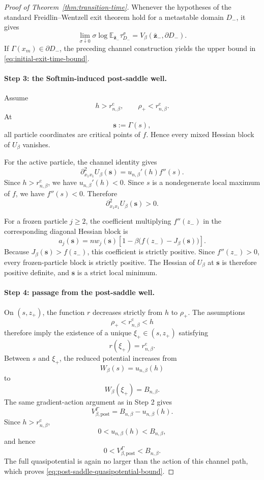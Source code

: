 \documentclass{article}
\theoremstyle{plain}
\theoremstyle{definition}
\theoremstyle{remark}
\begin{document}
\begin{proof}[Proof of Theorem~\ref{thm:transition-time}]
Whenever the hypotheses of the standard Freidlin--Wentzell exit theorem hold for a metastable domain \(D_-\), it gives
\[
    \lim_{\sigma\downarrow0}
    \sigma\log
    \mathbb E_{\bar{\mathbf z}_-}\tau_{D_-}^\sigma
    =
    V_\beta(\bar{\mathbf z}_-,\partial D_-).
\]
If \(\Gamma(x_m)\in\partial D_-\), the preceding channel construction yields the upper bound in \eqref{eq:initial-exit-time-bound}.

\paragraph{Step 3: the Softmin-induced post-saddle well.}
Assume
\[
    h>r_{n,\beta}^{\mathrm c},
    \qquad
    \rho_+<r_{n,\beta}^{\mathrm c}.
\]
At
\[
    \mathbf s:=\Gamma(s),
\]
all particle coordinates are critical points of \(f\). Hence every mixed Hessian block of \(U_\beta\) vanishes.

For the active particle, the channel identity gives
\[
    \partial_{x_1x_1}^2U_\beta(\mathbf s)
    =
    u_{n,\beta}'(h)f''(s).
\]
Since \(h>r_{n,\beta}^{\mathrm c}\), we have
\(u_{n,\beta}'(h)<0\). Since \(s\) is a nondegenerate local maximum of \(f\), we have \(f''(s)<0\). Therefore
\[
    \partial_{x_1x_1}^2U_\beta(\mathbf s)>0.
\]

For a frozen particle \(j\ge2\), the coefficient multiplying
\(f''(z_-)\) in the corresponding diagonal Hessian block is
\[
    a_j(\mathbf s)
    =
    n w_j(\mathbf s)
    \left[
        1-
        \beta\bigl(f(z_-)-J_\beta(\mathbf s)\bigr)
    \right].
\]
Because \(J_\beta(\mathbf s)>f(z_-)\), this coefficient is strictly positive. Since \(f''(z_-)>0\), every frozen-particle block is strictly positive. The Hessian of \(U_\beta\) at \(\mathbf s\) is therefore positive definite, and \(\mathbf s\) is a strict local minimum.

\paragraph{Step 4: passage from the post-saddle well.}
On \((s,z_+)\), the function \(r\) decreases strictly from \(h\) to \(\rho_+\). The assumptions
\[
    \rho_+<r_{n,\beta}^{\mathrm c}<h
\]
therefore imply the existence of a unique
\(\xi_+\in(s,z_+)\) satisfying
\[
    r(\xi_+)=r_{n,\beta}^{\mathrm c}.
\]
Between \(s\) and \(\xi_+\), the reduced potential increases from
\[
    W_\beta(s)=u_{n,\beta}(h)
\]
to
\[
    W_\beta(\xi_+)=B_{n,\beta}.
\]
The same gradient-action argument as in Step 2 gives
\[
    V_{\beta,\mathrm{post}}^\Gamma
    =
    B_{n,\beta}-u_{n,\beta}(h).
\]
Since \(h>r_{n,\beta}^{\mathrm c}\),
\[
    0<u_{n,\beta}(h)<B_{n,\beta},
\]
and hence
\[
    0<
    V_{\beta,\mathrm{post}}^\Gamma
    <
    B_{n,\beta}.
\]
The full quasipotential is again no larger than the action of this channel path, which proves \eqref{eq:post-saddle-quasipotential-bound}.


\end{proof}
\end{document}
